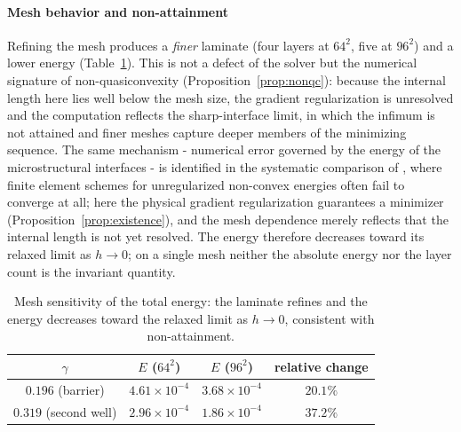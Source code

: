\documentclass[12pt]{article}
\theoremstyle{plain}
\theoremstyle{definition}
\begin{document}
\paragraph{Mesh behavior and non-attainment}
Refining the mesh produces a \emph{finer} laminate (four layers at $64^2$, five at
$96^2$) and a lower energy (Table~\ref{tab:res-mesh}). This is not a defect of the
solver but the numerical signature of non-quasiconvexity
(Proposition~\ref{prop:nonqc}): because the internal length here lies well below
the mesh size, the gradient regularization is unresolved and the computation
reflects the sharp-interface limit, in which the infimum is not attained and finer
meshes capture deeper members of the minimizing sequence. The same mechanism -
numerical error governed by the energy of the microstructural interfaces - is
identified in the systematic comparison of \citet{kumar2020assessment}, where
finite element schemes for unregularized non-convex energies often fail to
converge at all; here the physical gradient regularization guarantees a
minimizer (Proposition~\ref{prop:existence}), and the mesh dependence merely
reflects that the internal length is not yet resolved. The energy therefore
decreases toward its relaxed limit as $h\to0$; on a single mesh neither the absolute energy nor the layer count is the invariant quantity.

\begin{table}[h]\centering\small
\begin{tabular}{@{}cccc@{}}
\toprule
$\gamma$ & $E$ ($64^2$) & $E$ ($96^2$) & relative change \\
\midrule
$0.196$ (barrier) & $4.61\times10^{-4}$ & $3.68\times10^{-4}$ & $20.1\%$ \\
$0.319$ (second well) & $2.96\times10^{-4}$ & $1.86\times10^{-4}$ & $37.2\%$ \\
\bottomrule
\end{tabular}
\caption{Mesh sensitivity of the total energy: the laminate refines and the
energy decreases toward the relaxed limit as $h\to0$, consistent with
non-attainment.}
\label{tab:res-mesh}
\end{table}
\end{document}
